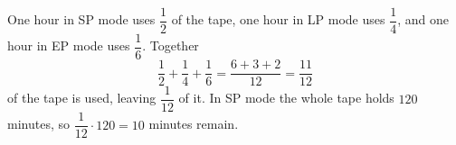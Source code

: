 One hour in SP mode uses $\dfrac{1}{2}$ of the tape, one hour in LP mode uses $\dfrac{1}{4}$, and one hour in EP mode uses $\dfrac{1}{6}$. Together
\[
\dfrac{1}{2}+\dfrac{1}{4}+\dfrac{1}{6}=\dfrac{6+3+2}{12}=\dfrac{11}{12}
\]
of the tape is used, leaving $\dfrac{1}{12}$ of it. In SP mode the whole tape holds $120$ minutes, so $\dfrac{1}{12}\cdot120=\boxed{10}$ minutes remain.

